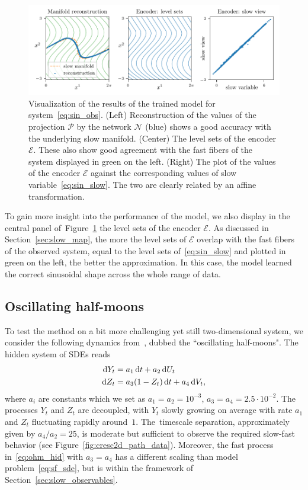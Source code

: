 \documentclass{article}
\newcommand{\enc}{\mathcal{E}} %
\newcommand{\net}{\mathcal{N}} %
\newcommand{\proj}{\mathcal{P}} %
\begin{document}
\begin{figure}
    \centering
    \includegraphics[width=\textwidth]{figs/sin2d_recon_fibers.pdf}
    \caption{Visualization of the results of the trained model for system~\eqref{eq:sin_obs}. (Left) Reconstruction of the values of the projection $\proj$ by the network $\net$ (blue) shows a good accuracy with the underlying slow manifold. (Center) The level sets of the encoder $\enc$. These also show good agreement with the fast fibers of the system displayed in green on the left. (Right) The plot of the values of the encoder $\enc$ against the corresponding values of slow variable~\eqref{eq:sin_slow}. The two are clearly related by an affine transformation.}
    \label{fig:sin2d_recon_fibers}
\end{figure}

To gain more insight into the performance of the model, we also display in the central panel of~Figure~\ref{fig:sin2d_recon_fibers} the level sets of the encoder $\enc$. As discussed in Section~\ref{sec:slow_map}, the more the level sets of $\enc$ overlap with the fast fibers of the observed system, equal to the level sets of~\eqref{eq:sin_slow} and plotted in green on the left, the better the approximation. In this case, the model learned the correct sinusoidal shape across the whole range of data.

\subsection{Oscillating half-moons}\label{sec:ohm}
To test the method on a bit more challenging yet still two-dimensional system, we consider the following dynamics from~\cite{singer_detecting_2009}, dubbed the ``oscillating half-moons". The hidden system of SDEs reads
\begin{gather}\label{eq:ohm_hid}
    \begin{aligned}
        \operatorname{d}\!{Y}_t &= a_1\operatorname{d}\!{t} + a_2\operatorname{d}\!{U}_t\\
        \operatorname{d}\!{Z}_t &= a_3(1-Z_t)\operatorname{d}\!{t} + a_4\operatorname{d}\!{V}_t,
    \end{aligned}
\end{gather}
where $a_i$ are constants which we set as $a_1=a_2=10^{-3}$, $a_3=a_4=2.5\cdot 10^{-2}$. The processes $Y_t$ and $Z_t$ are decoupled, with $Y_t$ slowly growing on average with rate $a_1$ and $Z_t$ fluctuating rapidly around~$1$. The~timescale separation, approximately given by $a_4/a_2=25$, is moderate but sufficient to observe the required slow-fast behavior (see Figure~\ref{fig:cresc2d_path_data}). Moreover, the fast process in~\eqref{eq:ohm_hid} with $a_3=a_4$ has a different scaling than model problem~\eqref{eq:sf_sde}, but is within the framework of Section~\ref{sec:slow_observables}.
\end{document}
